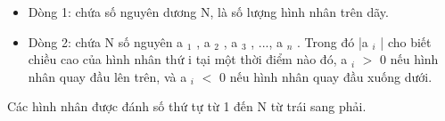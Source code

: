 \begin{itemize}
	\item     Dòng 1: chứa số nguyên dương N, là số lượng hình nhân trên dãy.   
	\item     Dòng 2: chứa N số nguyên a    $_     1    $    , a    $_     2    $    , a    $_     3    $    , ..., a    $_     n    $    . Trong đó |a    $_     i    $    | cho biết chiều cao của hình nhân thứ i tại một thời điểm nào đó, a    $_     i    $    $>$ 0 nếu hình nhân quay đầu lên trên, và a    $_     i    $    $<$ 0 nếu hình nhân quay đầu xuống dưới.   
\end{itemize}

   Các hình nhân được đánh số thứ tự từ 1 đến N từ trái sang phải.